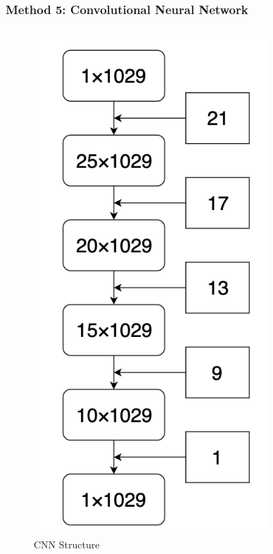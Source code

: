 \documentclass{beamer}
\begin{document}
\begin{frame}
\frametitle{Method 5: Convolutional Neural Network}
\begin{columns}
\begin{figure}[H]
    \centering
    \caption{CNN Structure}
    \includegraphics[width=0.8\textwidth]{img/model.png}
\end{figure}

\end{columns}
\end{frame}
\end{document}
